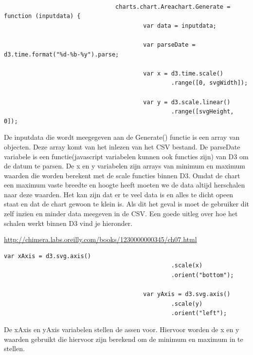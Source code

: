 \begin{lstlisting}[gobble=24]

                                charts.chart.Areachart.Generate = function (inputdata) {
                                        var data = inputdata;

                                        var parseDate = d3.time.format("%d-%b-%y").parse;

                                        var x = d3.time.scale()
                                                .range([0, svgWidth]);

                                        var y = d3.scale.linear()
                                                .range([svgHeight, 0]);
\end{lstlisting}

De inputdata die wordt meegegeven aan de Generate() functie is een array van objecten. Deze array komt van het inlezen van het CSV bestand. De parseDate variabele is een functie(javascript variabelen kunnen ook functies zijn) van D3 om de datum te parsen. De x en y variabelen zijn arrays van minimum en maximum waarden die worden berekent met de scale functies binnen D3. Omdat de chart een maximum vaste breedte en hoogte heeft moeten we de data altijd herschalen naar deze waarden. Het kan zijn dat er te veel data is en alles te dicht opeen staat en dat de chart gewoon te klein is. Als dit het geval is moet de gebruiker dit zelf inzien en minder data meegeven in de CSV. Een goede uitleg over hoe het schalen werkt binnen D3 vind je hieronder.

\url{http://chimera.labs.oreilly.com/books/1230000000345/ch07.html}

\begin{lstlisting}[gobble=24]
                                        var xAxis = d3.svg.axis()
                                                .scale(x)
                                                .orient("bottom");

                                        var yAxis = d3.svg.axis()
                                                .scale(y)
                                                .orient("left");
\end{lstlisting}

De xAxis en yAxis variabelen stellen de assen voor. Hiervoor worden de x en y waarden gebruikt die hiervoor zijn berekend om de minimum en maximum in te stellen.

